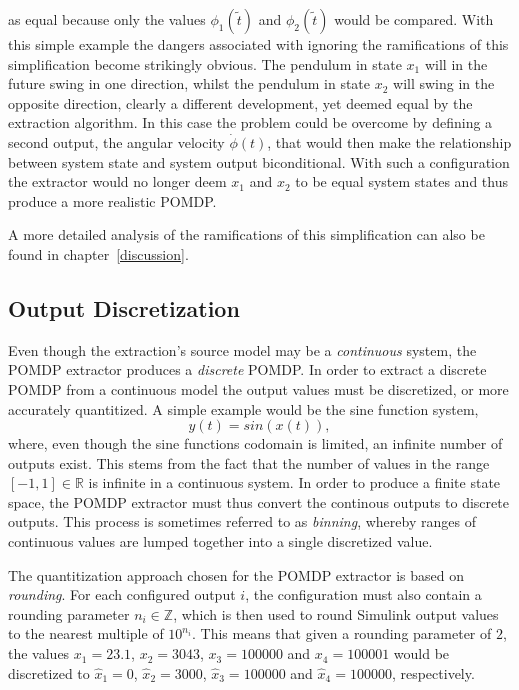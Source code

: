 as equal because only the values $\phi_1(\tilde{t})$ and $\phi_2(\tilde{t})$ would be compared. With this simple example the dangers associated with ignoring the ramifications of this simplification become strikingly obvious. The pendulum in state $x_1$ will in the future swing in one direction, whilst the pendulum in state $x_2$ will swing in the opposite direction, clearly a different development, yet deemed equal by the extraction algorithm. In this case the problem could be overcome by defining a second output, the angular velocity $\dot{\phi}(t)$, that would then make the relationship between system state and system output biconditional. With such a configuration the extractor would no longer deem $x_1$ and $x_2$ to be equal system states and thus produce a more realistic POMDP.

A more detailed analysis of the ramifications of this simplification can also be found in chapter~\ref{discussion}.

\subsection{Output Discretization}
\label{subsec:outputdiscretization}

Even though the extraction's source model may be a \textit{continuous} system, the POMDP extractor produces a \textit{discrete} POMDP. In order to extract a discrete POMDP from a continuous model the output values must be discretized, or more accurately quantitized. A simple example would be the sine function system, 
\[
y(t) = sin(x(t)),
\]
where, even though the sine functions codomain is limited, an infinite number of outputs exist. This stems from the fact that the number of values in the range $[-1,1]\in\mathbb{R}$ is infinite in a continuous system. In order to produce a finite state space, the POMDP extractor must thus convert the continous outputs to discrete outputs. This process is sometimes referred to as \textit{binning}, whereby ranges of continuous values are lumped together into a single discretized value.

The quantitization approach chosen for the POMDP extractor is based on \textit{rounding}. For each configured output $i$, the configuration must also contain a rounding parameter $n_i \in \mathbb{Z}$, which is then used to round Simulink output values to the nearest multiple of $10^{n_i}$. This means that given a rounding parameter of $2$, the values $x_1=23.1$, $x_2=3043$, $x_3=100000$ and $x_4=100001$ would be discretized to $\hat{x}_1=0$, $\hat{x}_2=3000$, $\hat{x}_3=100000$ and $\hat{x}_4=100000$, respectively.

